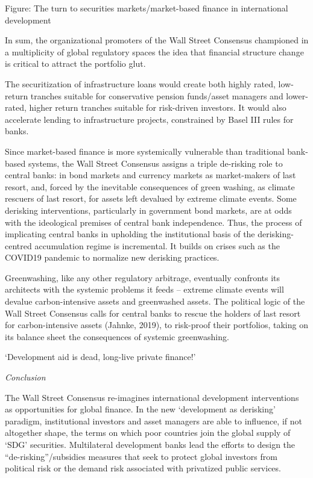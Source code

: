 \documentclass[
]{book}
\begin{document}
Figure: The turn to securities markets/market-based finance in international development

In sum, the organizational promoters of the Wall Street
Consensus championed in a multiplicity of global regulatory spaces the idea that
financial structure change is critical to attract the portfolio glut.

The
securitization of infrastructure loans would create both highly rated, low-return
tranches suitable for conservative pension funds/asset managers and lower-rated,
higher return tranches suitable for risk-driven investors. It would also accelerate lending
to infrastructure projects, constrained by Basel III rules for banks.

Since market-based finance is more systemically vulnerable than traditional bank-based
systems, the Wall Street Consensus assigns a triple de-risking role to central banks: in
bond markets and currency markets as market-makers of last resort,
and, forced by the inevitable consequences of green washing, as climate rescuers of last
resort, for assets left devalued by extreme climate events.
Some derisking
interventions, particularly in government bond markets, are at odds with the ideological
premises of central bank independence. Thus, the process of implicating central banks
in upholding the institutional basis of the derisking-centred accumulation regime is
incremental. It builds on crises such as the COVID19 pandemic to normalize new
derisking practices.

Greenwashing, like any
other regulatory arbitrage, eventually confronts its architects with the systemic
problems it feeds -- extreme climate events will devalue carbon-intensive assets and
greenwashed assets. The political logic of the Wall Street Consensus calls for central
banks to rescue the holders of last resort for carbon-intensive assets (Jahnke, 2019), to
risk-proof their portfolios, taking on its balance sheet the consequences of systemic
greenwashing.

`Development aid is dead, long-live private finance!'

\emph{Conclusion}

The Wall Street Consensus re-imagines international development interventions as
opportunities for global finance. In the new `development as derisking' paradigm,
institutional investors and asset managers are able to influence, if not altogether shape,
the terms on which poor countries join the global supply of `SDG' securities.
Multilateral development banks lead the efforts to design the ``de-risking''/subsidies
measures that seek to protect global investors from political risk or the demand risk
associated with privatized public services.
\end{document}
